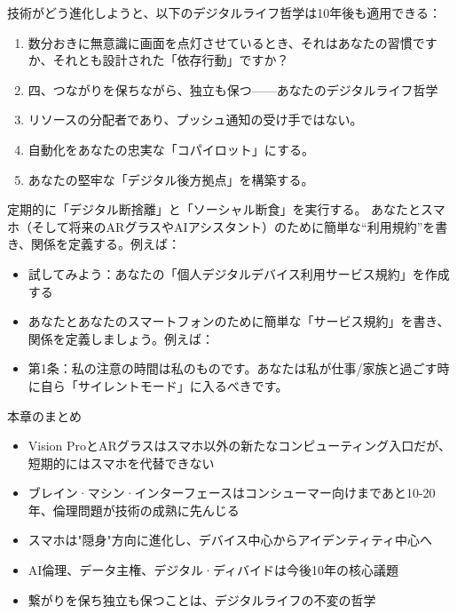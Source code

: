 技術がどう進化しようと、以下のデジタルライフ哲学は10年後も適用できる：

\begin{enumerate}
  \item 数分おきに無意識に画面を点灯させているとき、それはあなたの習慣ですか、それとも設計された「依存行動」ですか？
  \item 四、つながりを保ちながら、独立も保つ——あなたのデジタルライフ哲学
  \item リソースの分配者であり、プッシュ通知の受け手ではない。
  \item 自動化をあなたの忠実な「コパイロット」にする。
  \item あなたの堅牢な「デジタル後方拠点」を構築する。
\end{enumerate}

\begin{tcbpractice}{定期的に「デジタル断捨離」と「ソーシャル断食」を実行する。}
あなたとスマホ（そして将来のARグラスやAIアシスタント）のために簡単な“利用規約”を書き、関係を定義する。例えば：

\begin{itemize}
  \item 試してみよう：あなたの「個人デジタルデバイス利用サービス規約」を作成する
  \item あなたとあなたのスマートフォンのために簡単な「サービス規約」を書き、関係を定義しましょう。例えば：
  \item 第1条：私の注意の時間は私のものです。あなたは私が仕事/家族と過ごす時に自ら「サイレントモード」に入るべきです。
\end{itemize}

\end{tcbpractice}

\begin{tcbsummary}{本章のまとめ}
\begin{itemize}
  \item Vision ProとARグラスはスマホ以外の新たなコンピューティング入口だが、短期的にはスマホを代替できない
  \item ブレイン·マシン·インターフェースはコンシューマー向けまであと10-20年、倫理問題が技術の成熟に先んじる
  \item スマホは"隠身"方向に進化し、デバイス中心からアイデンティティ中心へ
  \item AI倫理、データ主権、デジタル·ディバイドは今後10年の核心議題
  \item 繋がりを保ち独立も保つことは、デジタルライフの不変の哲学
\end{itemize}

\end{tcbsummary}
